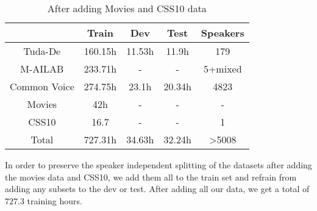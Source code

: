 \begin{table}
	\centering
	\begin{tabular}{ | c | c | c | c | c | } 
		\hline
		& Train   & Dev    & Test   & Speakers  \\ 
		\hline
		Tuda-De      & 160.15h & 11.53h & 11.9h  & 179       \\
		\hline
		M-AILAB      & 233.71h & -      &   -    & 5+mixed   \\ 
		\hline
		Common Voice & 274.75h & 23.1h  & 20.34h & 4823      \\
		\hline
		Movies       & 42h     & -      & -      & -         \\
		\hline
		CSS10        & 16.7    & -      & -      & 1         \\
		\hline
		Total        & 727.31h & 34.63h & 32.24h & >5008     \\
		\hline
	\end{tabular}
	\caption{After adding Movies and CSS10 data}
	\label{meth:table3}
\end{table}

In order to preserve the speaker independent splitting of the datasets after adding the movies data and CSS10, we add them all to the train set and refrain from adding any subsets to the dev or test. After adding all our data, we get a total of $727.3$ training hours.




